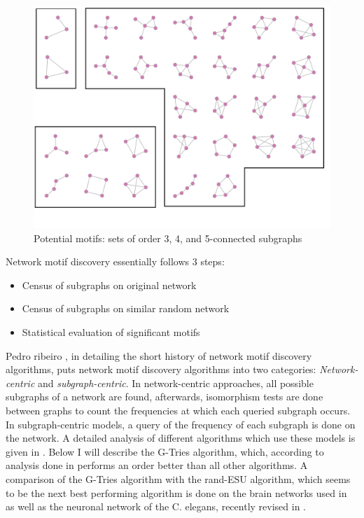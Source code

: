 \begin{figure}[t!]
\includegraphics[scale=.07]{figs/subgraphs.png}
\centering
\caption{Potential motifs: sets of order 3, 4, and 5-connected subgraphs}\end{figure}
Network motif discovery essentially follows 3 steps:
\begin{itemize}
\item{Census of subgraphs on original network}
\item{Census of subgraphs on similar random network}
\item{Statistical evaluation of significant motifs}
\end{itemize}
Pedro ribeiro \cite{ribeiro11}, in detailing the short history of network motif discovery algorithms, puts network motif discovery algorithms into two categories: \textit{Network-centric} and \textit{subgraph-centric}. In network-centric approaches, all possible subgraphs of a network are found, afterwards, isomorphism tests are done between graphs to count the frequencies at which each queried subgraph occurs. In subgraph-centric models, a query of the frequency of each subgraph is done on the network. A detailed analysis of different algorithms which use these models is given in \cite{ribeiro11}. Below I will describe the G-Tries algorithm, which, according to analysis done in \cite{ribeiro11} performs an order better than all other algorithms. A comparison of the G-Tries algorithm with the rand-ESU algorithm, which seems to be the next best performing algorithm \cite{li12} is done on the brain networks used in \cite{rubinov10} as well as the neuronal network of the C. elegans, recently revised in \cite{varshney11}. 
